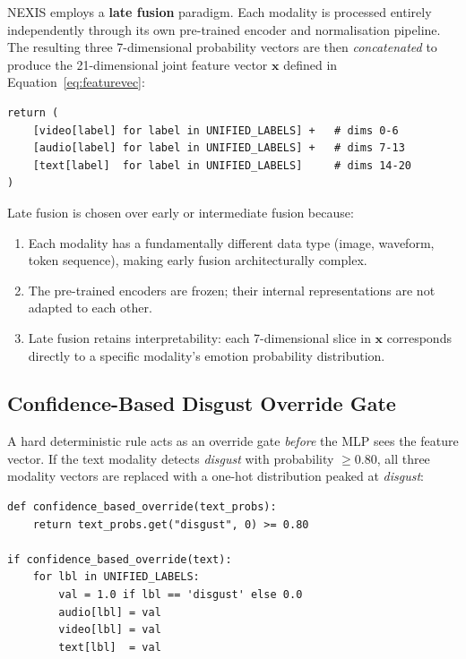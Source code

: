 \documentclass[12pt,a4paper]{article}
\begin{document}
NEXIS employs a \textbf{late fusion} paradigm. Each modality is processed
entirely independently through its own pre-trained encoder and normalisation
pipeline. The resulting three 7-dimensional probability vectors are then
\textit{concatenated} to produce the 21-dimensional joint feature vector
$\mathbf{x}$ defined in Equation~\eqref{eq:featurevec}:

\begin{lstlisting}[caption={Late fusion concatenation (the critical line in predict\_emotion.py).}]
return (
    [video[label] for label in UNIFIED_LABELS] +   # dims 0-6
    [audio[label] for label in UNIFIED_LABELS] +   # dims 7-13
    [text[label]  for label in UNIFIED_LABELS]     # dims 14-20
)
\end{lstlisting}

Late fusion is chosen over early or intermediate fusion because:
\begin{enumerate}[leftmargin=2em]
  \item Each modality has a fundamentally different data type (image, waveform,
        token sequence), making early fusion architecturally complex.
  \item The pre-trained encoders are frozen; their internal representations
        are not adapted to each other.
  \item Late fusion retains interpretability: each 7-dimensional slice in
        $\mathbf{x}$ corresponds directly to a specific modality's emotion
        probability distribution.
\end{enumerate}

\subsection{Confidence-Based Disgust Override Gate}

A hard deterministic rule acts as an override gate \textit{before} the MLP
sees the feature vector. If the text modality detects \textit{disgust} with
probability $\geq 0.80$, all three modality vectors are replaced with a
one-hot distribution peaked at \textit{disgust}:

\begin{lstlisting}[caption={Disgust gate override.}]
def confidence_based_override(text_probs):
    return text_probs.get("disgust", 0) >= 0.80

if confidence_based_override(text):
    for lbl in UNIFIED_LABELS:
        val = 1.0 if lbl == 'disgust' else 0.0
        audio[lbl] = val
        video[lbl] = val
        text[lbl]  = val
\end{lstlisting}
\end{document}
